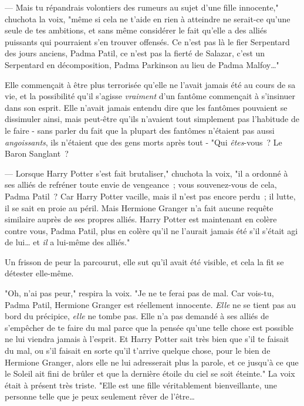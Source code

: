 --- Mais tu répandrais volontiers des rumeurs au sujet d'une fille innocente," chuchota la voix, "même si cela ne t'aide en rien à atteindre ne serait-ce qu'une seule de tes ambitions, et sans même considérer le fait qu'elle a des alliés puissants qui pourraient s'en trouver offensés. Ce n'est pas là le fier Serpentard des jours anciens, Padma Patil, ce n'est pas la fierté de Salazar, c'est un Serpentard en décomposition, Padma Parkinson au lieu de Padma Malfoy…"

Elle commençait à être plus terrorisée qu'elle ne l'avait jamais été au cours de sa vie, et la possibilité qu'il s'agisse \emph{vraiment} d'un fantôme commençait à s'insinuer dans son esprit. Elle n'avait jamais entendu dire que les fantômes pouvaient se dissimuler ainsi, mais peut-être qu'ils n'avaient tout simplement pas l'habitude de le faire - sans parler du fait que la plupart des fantômes n'étaient pas aussi \emph{angoissants}, ils n'étaient que des gens morts après tout - "Qui \emph{êtes}-vous~? Le Baron Sanglant~?

--- Lorsque Harry Potter s'est fait brutaliser," chuchota la voix, "il a ordonné à ses alliés de refréner toute envie de vengeance~; vous souvenez-vous de cela, Padma Patil~? Car Harry Potter vacille, mais il n'est pas encore perdu~; il lutte, il se sait en proie au péril. Mais Hermione Granger n'a fait aucune requête similaire auprès de ses propres alliés. Harry Potter est maintenant en colère contre vous, Padma Patil, plus en colère qu'il ne l'aurait jamais été s'il s'était agi de lui… et \emph{il} a lui-même des alliés."

Un frisson de peur la parcourut, elle sut qu'il avait été visible, et cela la fit se détester elle-même.

"Oh, n'ai pas peur," respira la voix. "Je ne te ferai pas de mal. Car vois-tu, Padma Patil, Hermione Granger est réellement innocente. \emph{Elle} ne se tient pas au bord du précipice, \emph{elle} ne tombe pas. Elle n'a pas demandé à ses alliés de s'empêcher de te faire du mal parce que la pensée qu'une telle chose est possible ne lui viendra jamais à l'esprit. Et Harry Potter sait très bien que s'il te faisait du mal, ou s'il faisait en sorte qu'il t'arrive quelque chose, pour le bien de Hermione Granger, alors elle ne lui adresserait plus la parole, et ce jusqu'à ce que le Soleil ait fini de brûler et que la dernière étoile du ciel se soit éteinte." La voix était à présent très triste. "Elle est une fille véritablement bienveillante, une personne telle que je peux seulement rêver de l'être…

